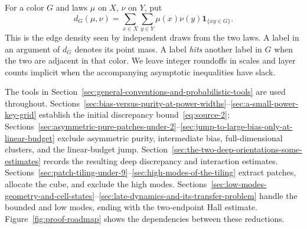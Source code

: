 For a color \(G\) and laws \(\mu\) on \(X\), \(\nu\) on \(Y\), put
\[
 d_G(\mu,\nu)=\sum_{x\in X}\sum_{y\in Y}
                  \mu(x)\nu(y)\mathbf 1_{\{xy\in G\}}.
\]
This is the edge density seen by independent draws from the two laws.
A label in an argument of \(d_G\) denotes its point mass. A label
\emph{hits} another label in \(G\) when the two are adjacent in that
color. We leave integer roundoffs in scales and layer counts implicit
when the accompanying asymptotic inequalities have slack.

The tools in Section~\ref{sec:general-conventions-and-probabilistic-tools}
are used throughout. Sections~\ref{sec:bias-versus-purity-at-power-widths}--\ref{sec:a-small-power-key-grid}
establish the initial discrepancy bound~\eqref{eq:source-2};
Sections~\ref{sec:asymmetric-pure-patches-under-2}--\ref{sec:jump-to-large-bias-only-at-linear-budget}
exclude asymmetric purity, intermediate bias, full-dimensional clusters,
and the linear-budget jump.
Section~\ref{sec:the-two-deep-orientations-some-estimates} records the
resulting deep discrepancy and interaction estimates.
Sections~\ref{sec:patch-tiling-under-9}--\ref{sec:high-modes-of-the-tiling}
extract patches, allocate the cube, and exclude the high modes.
Sections~\ref{sec:low-modes-geometry-and-cell-states}--\ref{sec:late-dynamics-and-its-transfer-problem}
handle the bounded and low modes, ending with the two-endpoint Hall
estimate. Figure~\ref{fig:proof-roadmap} shows the dependencies between
these reductions.
